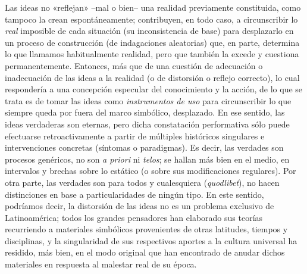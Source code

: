 Las ideas no «reflejan» --mal o bien-- una realidad previamente constituida, como tampoco la crean espontáneamente; contribuyen, en todo caso, a circunscribir lo \emph{real} imposible de cada situación (su inconsistencia de base) para desplazarlo en un proceso de construcción (de indagaciones aleatorias) que, en parte, determina lo que llamamos habitualmente realidad, pero que también la excede y cuestiona permanentemente. Entonces, más que de una cuestión de adecuación o inadecuación de las ideas a la realidad (o de distorsión o reflejo correcto), lo cual respondería a una concepción especular del conocimiento y la acción, de lo que se trata es de tomar las ideas como \emph{instrumentos de uso} para circunscribir lo que siempre queda por fuera del marco simbólico, desplazado. En ese sentido, las ideas verdaderas son eternas, pero dicha constatación performativa sólo puede efectuarse retroactivamente a partir de múltiples históricos singulares e intervenciones concretas (síntomas o paradigmas). Es decir, las verdades son procesos genéricos, no son \emph{a priori} ni \emph{telos}; se hallan más bien en el medio, en intervalos y brechas sobre lo estático (o sobre sus modificaciones regulares). Por otra parte, las verdades son para todos y cualesquiera (\emph{quodlibet}), no hacen distinciones en base a particularidades de ningún tipo. En este sentido, podríamos decir, la distorsión de las ideas no es un problema exclusivo de Latinoamérica; todos los grandes pensadores han elaborado sus teorías recurriendo a materiales simbólicos provenientes de otras latitudes, tiempos y disciplinas, y la singularidad de sus respectivos aportes a la cultura universal ha residido, más bien, en el modo original que han encontrado de anudar dichos materiales en respuesta al malestar real de su época.

